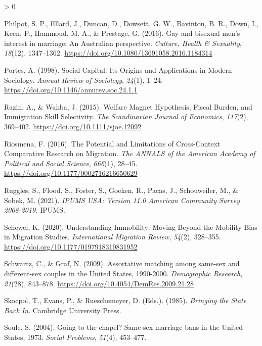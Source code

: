 \documentclass[
  12pt,
]{article}
\newlength{\cslhangindent}
\newenvironment{CSLReferences}[2] %
 {%
  \setlength{\parindent}{0pt}
  \ifodd #1 \everypar{\setlength{\hangindent}{\cslhangindent}}\ignorespaces\fi
  \ifnum #2 > 0
  \setlength{\parskip}{#2\baselineskip}
  \fi
 }%
 {}
\begin{document}
\begin{CSLReferences}{1}{0}
\leavevmode\hypertarget{ref-philpot_2016_gay}{}%
Philpot, S. P., Ellard, J., Duncan, D., Dowsett, G. W., Bavinton, B. R., Down, I., Keen, P., Hammoud, M. A., \& Prestage, G. (2016). Gay and bisexual men's interest in marriage: An {Australian} perspective. \emph{Culture, Health \& Sexuality}, \emph{18}(12), 1347--1362. \url{https://doi.org/10.1080/13691058.2016.1184314}

\leavevmode\hypertarget{ref-portes_1998}{}%
Portes, A. (1998). Social {Capital}: Its {Origins} and {Applications} in {Modern Sociology}. \emph{Annual Review of Sociology}, \emph{24}(1), 1--24. \url{https://doi.org/10.1146/annurev.soc.24.1.1}

\leavevmode\hypertarget{ref-razin_2015}{}%
Razin, A., \& Wahba, J. (2015). Welfare {Magnet Hypothesis}, {Fiscal Burden}, and {Immigration Skill Selectivity}. \emph{The Scandinavian Journal of Economics}, \emph{117}(2), 369--402. \url{https://doi.org/10.1111/sjoe.12092}

\leavevmode\hypertarget{ref-riosmena_2016_potential}{}%
Riosmena, F. (2016). The {Potential} and {Limitations} of {Cross}-{Context Comparative Research} on {Migration}. \emph{The ANNALS of the American Academy of Political and Social Science}, \emph{666}(1), 28--45. \url{https://doi.org/10.1177/0002716216650629}

\leavevmode\hypertarget{ref-ruggles_2021}{}%
Ruggles, S., Flood, S., Foster, S., Goeken, R., Pacas, J., Schouweiler, M., \& Sobek, M. (2021). \emph{{IPUMS USA}: Version 11.0 {American Community Survey} 2008-2019.} {IPUMS}.

\leavevmode\hypertarget{ref-schewel_2020}{}%
Schewel, K. (2020). Understanding {Immobility}: Moving {Beyond} the {Mobility Bias} in {Migration Studies}. \emph{International Migration Review}, \emph{54}(2), 328--355. \url{https://doi.org/10.1177/0197918319831952}

\leavevmode\hypertarget{ref-schwartz_2009}{}%
Schwartz, C., \& Graf, N. (2009). Assortative matching among same-sex and different-sex couples in the {United States}, 1990-2000. \emph{Demographic Research}, \emph{21}(28), 843--878. \url{https://doi.org/10.4054/DemRes.2009.21.28}

\leavevmode\hypertarget{ref-skocpol_1985}{}%
Skocpol, T., Evans, P., \& Rueschemeyer, D. (Eds.). (1985). \emph{Bringing the {State Back In}}. {Cambridge University Press}.

\leavevmode\hypertarget{ref-soule_2004}{}%
Soule, S. (2004). Going to the chapel? Same-sex marriage bans in the {United States}, 1973{}. \emph{Social Problems}, \emph{51}(4), 453--477.


\end{CSLReferences}
\end{document}
